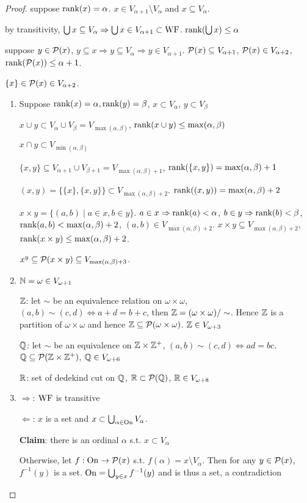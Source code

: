 \documentclass[11pt]{article}
\begin{document}
\begin{proof}
suppose \(\text{rank}(x)=\alpha\). \(x\in V_{\alpha+1}\setminus V_\alpha\) and \(x\subseteq V_\alpha\).

by transitivity, \(\bigcup x\subseteq V_\alpha\Rightarrow \bigcup x\in V_{\alpha+1}\subset\operatorname{WF}\). \(\text{rank}(\bigcup x)\le\alpha\)

suppose
\(y\in\mathcal{P}(x)\),
\(y\subseteq x\Rightarrow y\subseteq V_\alpha\Rightarrow y\in V_{\alpha+1}\). \(\mathcal{P}(x)\subseteq V_{\alpha+1}\), \(\mathcal{P}(x)\in V_{\alpha+2}\), \(\text{rank}(\mathcal{P}(x))\le\alpha+1\).

\(\{x\}\in\mathcal{P}(x)\in V_{\alpha+2}\).

\begin{enumerate}
\item Suppose \(\text{rank}(x)=\alpha,\text{rank}(y)=\beta\), \(x\subset V_\alpha\), \(y\subset V_\beta\)

\(x\cup y\subset V_\alpha\cup V_\beta=V_{\max(\alpha,\beta)}\), \(\text{rank}(x\cup y)\le\max(\alpha,\beta)\)

\(x\cap y\subset V_{\min(\alpha,\beta)}\)

\(\{x,y\}\subseteq V_{\alpha+1}\cup V_{\beta+1}=V_{\max(\alpha,\beta)+1}\), \(\text{rank}(\{x,y\})=\max(\alpha,\beta)+1\)

\((x,y)=\{\{x\},\{x,y\}\}\subset V_{\max(\alpha,\beta)+2}\). \(\text{rank}((x,y))=\max(\alpha,\beta)+2\)

\(x\times y=\{(a,b)\mid a\in x,b\in y\}\).
\(a\in x\Rightarrow\text{rank}(a)<\alpha\), \(b\in y\Rightarrow\text{rank}(b)<\beta\), \(\text{rank}(a,b)<\max(\alpha,\beta)+2\),
\((a,b)\in V_{\max(\alpha,\beta)+2}\). \(x\times y\subseteq V_{\max(\alpha,\beta)+2}\), \(\text{rank}(x\times y)\le\max(\alpha,\beta)+2\).

\(x^y\subseteq\mathcal{P}(x\times y)\subseteq V_{\max(\alpha,\beta)+3}\).

\item \(\mathbb{N}=\omega\in V_{\omega+1}\)

\(\mathbb{Z}\): let \(\sim\) be an equivalence relation on \(\omega\times\omega\), \((a,b)\sim(c,d)\Leftrightarrow a+d=b+c\),
then \(\mathbb{Z}=(\omega\times\omega)/\sim\). Hence \(\mathbb{Z}\) is a partition of \(\omega\times\omega\) and
hence \(\mathbb{Z}\subseteq\mathcal{P}(\omega\times\omega)\). \(\mathbb{Z}\in V_{\omega+3}\)

\(\mathbb{Q}\): let \(\sim\) be an equivalence
on \(\mathbb{Z}\times\mathbb{Z}^+\), \((a,b)\sim(c,d)\Leftrightarrow ad=bc\). \(\mathbb{Q}\subseteq\mathcal{P}(\mathbb{Z}\times\mathbb{Z}^+)\), \(\mathbb{Q}\in V_{\omega+6}\)

\(\mathbb{R}\): set of dedekind cut on \(\mathbb{Q}\), \(\mathbb{R}\subset\mathcal{P}(\mathbb{Q})\), \(\mathbb{R}\in V_{\omega+8}\)

\item \(\Rightarrow\): \(\operatorname{WF}\) is transitive

\(\Leftarrow\): \(x\) is a set and \(x\subset\bigcup_{\alpha\in\operatorname{On}}V_\alpha\).

\textbf{Claim}: there is an ordinal \(\alpha\) s.t. \(x\subset V_\alpha\)

Otherwise, let \(f:\operatorname{On}\to\mathcal{P}(x)\) s.t. \(f(\alpha)=x\setminus V_\alpha\). Then for any \(y\in\mathcal{P}(x)\), \(f^{-1}(y)\) is
a set. \(\operatorname{On}=\bigcup_{y\in x}f^{-1}(y)\) and is thus a set, a contradiction
\end{enumerate}
\end{proof}
\end{document}
